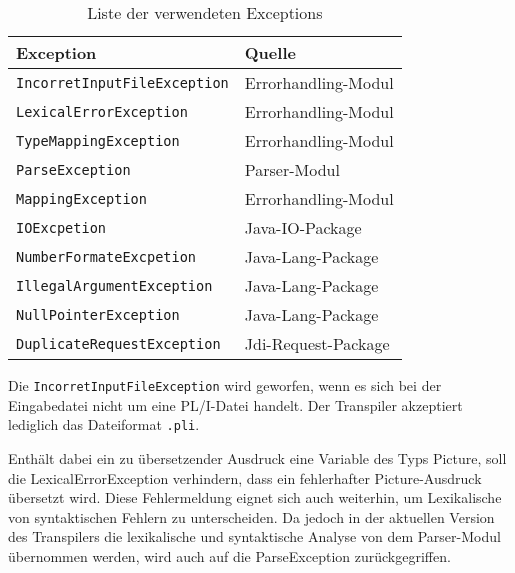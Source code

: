 \begin{table}[h]
	\centering
	
	\begin{tabularx}{\textwidth}{|X|X|}
		\hline
		\textbf{Exception} & \textbf{Quelle}  \\
		\hline
		\verb+IncorretInputFileException+ & Errorhandling-Modul  \\
		
		\verb+LexicalErrorException+ & Errorhandling-Modul  \\
		
		\verb+TypeMappingException+ & Errorhandling-Modul \\
		
		\verb+ParseException+ & Parser-Modul \\
		
		\verb+MappingException+ & Errorhandling-Modul \\
		
		\verb+IOExcpetion+ & Java-IO-Package \\
		
		\verb+NumberFormateExcpetion+ & Java-Lang-Package \\
		
		\verb+IllegalArgumentException+ & Java-Lang-Package \\
		
		\verb+NullPointerException+ & Java-Lang-Package \\
		
		\verb+DuplicateRequestException+ & Jdi-Request-Package \\
		\hline
		
	\end{tabularx}
	
	\caption{Liste der verwendeten Exceptions \label{tab:exceptiontabel}}
\end{table}
Die \verb+IncorretInputFileException+ wird geworfen, wenn
es sich bei der Eingabedatei nicht um eine PL/I-Datei handelt.
Der Transpiler akzeptiert lediglich das Dateiformat \verb+.pli+.

Enthält dabei ein zu übersetzender Ausdruck eine Variable des Typs Picture, soll die LexicalErrorException verhindern, dass ein fehlerhafter Picture-Ausdruck übersetzt wird.
Diese Fehlermeldung eignet sich auch weiterhin, um Lexikalische von syntaktischen Fehlern zu unterscheiden. Da jedoch in der aktuellen Version des Transpilers die lexikalische und syntaktische Analyse von dem Parser-Modul übernommen werden, wird auch auf die ParseException zurückgegriffen.

